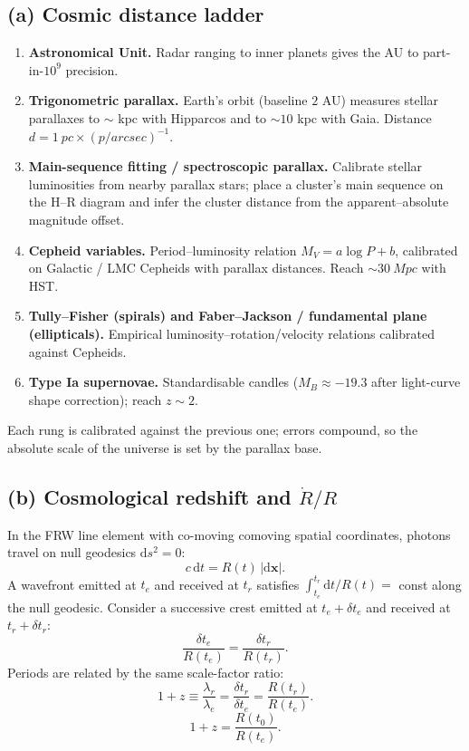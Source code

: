 \documentclass[11pt]{article}
\newcommand{\de}{\mathrm{d}}
\begin{document}
\subsection*{(a) Cosmic distance ladder}

\begin{enumerate}
  \item \textbf{Astronomical Unit.} Radar ranging to inner planets gives the AU to part-in-$10^9$ precision.
  \item \textbf{Trigonometric parallax.} Earth's orbit (baseline $2$ AU) measures stellar parallaxes to $\sim$ kpc with Hipparcos and to $\sim 10$ kpc with Gaia. Distance $d=\SI{1}{pc}\times(p/\si{arcsec})^{-1}$.
  \item \textbf{Main-sequence fitting / spectroscopic parallax.} Calibrate stellar luminosities from nearby parallax stars; place a cluster's main sequence on the H--R diagram and infer the cluster distance from the apparent--absolute magnitude offset.
  \item \textbf{Cepheid variables.} Period--luminosity relation $M_V = a\log P + b$, calibrated on Galactic / LMC Cepheids with parallax distances. Reach $\sim\SI{30}{Mpc}$ with HST.
  \item \textbf{Tully--Fisher (spirals) and Faber--Jackson / fundamental plane (ellipticals).} Empirical luminosity--rotation/velocity relations calibrated against Cepheids.
  \item \textbf{Type Ia supernovae.} Standardisable candles ($M_B \approx -19.3$ after light-curve shape correction); reach $z \sim 2$.
\end{enumerate}
Each rung is calibrated against the previous one; errors compound, so the absolute scale of the universe is set by the parallax base.

\subsection*{(b) Cosmological redshift and $\dot R/R$}

In the FRW line element with co-moving comoving spatial coordinates, photons travel on null geodesics $\de s^2=0$:
\[
c\,\de t = R(t)\,|\de\bm x|.
\]
A wavefront emitted at $t_e$ and received at $t_r$ satisfies $\int_{t_e}^{t_r}\de t/R(t) = $ const along the null geodesic. Consider a successive crest emitted at $t_e + \delta t_e$ and received at $t_r + \delta t_r$:
\[
\frac{\delta t_e}{R(t_e)} = \frac{\delta t_r}{R(t_r)}.
\]
Periods are related by the same scale-factor ratio:
\[
1 + z \equiv \frac{\lambda_r}{\lambda_e} = \frac{\delta t_r}{\delta t_e} = \frac{R(t_r)}{R(t_e)}.
\]
\[
\boxed{\;1 + z = \frac{R(t_0)}{R(t_e)}.\;}
\]
\end{document}
